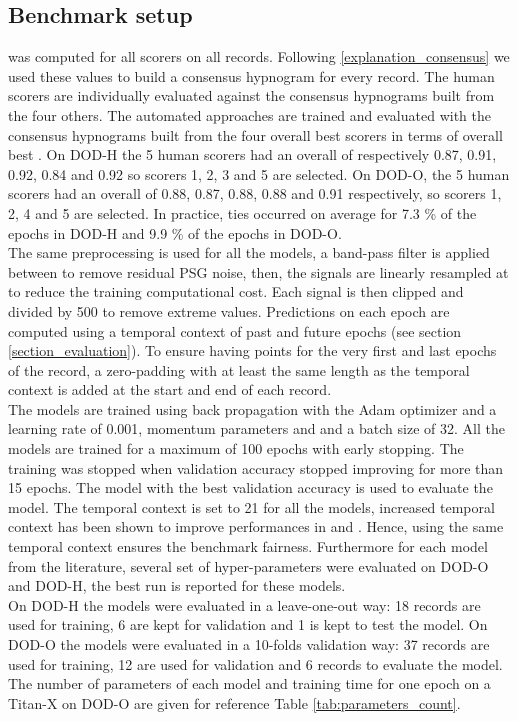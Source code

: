 \documentclass[journal]{IEEEtran}
\begin{document}
\subsection{Benchmark setup}  \label{experiment:setup}
\label{benchmark-setup}
 was computed for all scorers on all records. Following \ref{explanation_consensus} we used these values to build a consensus hypnogram for every record. The human scorers are individually evaluated against the consensus hypnograms built from the four others. The automated approaches are trained and evaluated with the consensus hypnograms built from the four overall best scorers in terms of overall best . On DOD-H the 5 human scorers had an overall  of respectively 0.87, 0.91, 0.92, 0.84 and 0.92 so scorers 1, 2, 3 and 5 are selected. On DOD-O, the 5 human scorers had an overall  of 0.88, 0.87, 0.88, 0.88 and 0.91 respectively, so scorers 1, 2, 4 and 5 are selected. In practice, ties occurred on average for 7.3 \% of the epochs in DOD-H and 9.9 \% of the epochs in DOD-O.\\
The same preprocessing is used for all the models, a band-pass filter is applied between  to remove residual PSG noise, then, the signals are linearly resampled at  to reduce the training computational cost. Each signal is then clipped and divided by 500 to remove extreme values. Predictions on each epoch are computed using a temporal context of past and future epochs (see section \ref{section_evaluation}). To ensure having points for the very first and last epochs of the record, a zero-padding with at least the same length as the temporal context is added at the start and end of each record.  \\
The models are trained using back propagation with the Adam optimizer and a learning rate of 0.001, momentum parameters  and  and a batch size of 32. All the models are trained for a maximum of 100 epochs with early stopping. The training was stopped when validation accuracy stopped improving for more than 15 epochs. The model with the best validation accuracy is used to evaluate the model. The temporal context is set to 21 for all the models, increased temporal context has been shown to improve performances in \cite{Chambon2018} and \cite{Phan2018c}. Hence, using the same temporal context ensures the benchmark fairness. Furthermore for each model from the literature, several set of hyper-parameters were evaluated on DOD-O and DOD-H, the best run is reported for these models. \\
On DOD-H the models were evaluated in a leave-one-out way: 18 records are used for training, 6 are kept for validation and 1 is kept to test the model. On DOD-O the models were evaluated in a 10-folds validation way: 37 records are used for training, 12 are used for validation and 6 records to evaluate the model.\\
The number of parameters of each model and training time for one epoch on a Titan-X on DOD-O are given for reference Table \ref{tab:parameters_count}.
\end{document}
